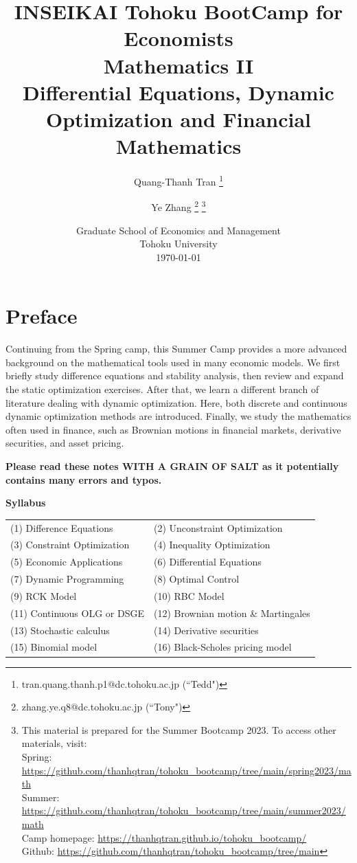 \documentclass[11pt,a4paper]{book}
\author{%
	Quang-Thanh Tran \thanks{tran.quang.thanh.p1@dc.tohoku.ac.jp (``Tedd")}
	\and Ye Zhang  \thanks{zhang.ye.q8@dc.tohoku.ac.jp (``Tony") } \footnote{ This material is prepared for the Summer Bootcamp 2023. To access other materials, visit: \\
		Spring: \url{https://github.com/thanhqtran/tohoku_bootcamp/tree/main/spring2023/math} \\
		Summer: \url{https://github.com/thanhqtran/tohoku_bootcamp/tree/main/summer2023/math} \\
		Camp homepage: \url{https://thanhqtran.github.io/tohoku_bootcamp/} \\ 
		Github: \url{https://github.com/thanhqtran/tohoku_bootcamp/tree/main}
	}
}
\title{INSEIKAI Tohoku BootCamp for Economists \\ \textbf{Mathematics II \\ \Large Differential Equations, Dynamic Optimization and Financial Mathematics}}
\date{Graduate School of Economics and Management \\Tohoku University \\[\baselineskip] \today \\[\baselineskip] 
	}
\theoremstyle{definition}\newtheorem{definition}{Definition}
\theoremstyle{definition}\newtheorem{fact}{Fact}
\theoremstyle{definition}\newtheorem{remark}{Remark}
\theoremstyle{definition}\newtheorem{ex}{Ex.}
\theoremstyle{definition}\newtheorem{project}{Project}
\theoremstyle{definition}\newtheorem{problem}{Problem}
\theoremstyle{definition}\newtheorem{example}{Example}
\numberwithin{theorem}{section}
\numberwithin{corollary}{chapter}
\numberwithin{assumption}{chapter}
\numberwithin{definition}{chapter}
\numberwithin{prop}{chapter}
\numberwithin{notation}{chapter}
\numberwithin{problem}{chapter}
\numberwithin{example}{chapter}
\numberwithin{fact}{chapter}
\numberwithin{ex}{chapter}
\renewcommand*{\thefootnote}{(\arabic{footnote})}
\begin{document}
	{
		\makeatletter
		\addtocounter{footnote}{1} %
		\renewcommand\thefootnote{\@fnsymbol\c@footnote}%
		\makeatother
		\maketitle
	}
	
	\setcounter{footnote}{0}
	\setcounter{tocdepth}{2}
	\tableofcontents
	
	\chapter*{Preface}
	
		Continuing from the Spring camp, this Summer Camp provides a more advanced background on the mathematical tools used in many economic models. We first briefly study difference equations and stability analysis, then review and expand the static optimization exercises. After that, we learn a different branch of literature dealing with dynamic optimization. Here, both discrete and continuous dynamic optimization methods are introduced. Finally, we study the mathematics often used in finance, such as Brownian motions in financial markets, derivative securities, and asset pricing.
		
		\textbf{Please read these notes WITH A GRAIN OF SALT as it potentially contains many errors and typos.}
	
	
	\textbf{Syllabus}	
	\begin{table}[ht]
		\centering
		\begin{tabular}{ l  l}
			\hline 
			(1) Difference Equations                     & (2) Unconstraint Optimization                 \\
			(3) Constraint Optimization    & (4) Inequality Optimization   \\
			(5) Economic Applications              & (6) Differential Equations    \\
			(7) Dynamic Programming & (8) Optimal Control             \\
			(9) RCK Model & (10) RBC Model          \\
			(11) Continuous OLG or DSGE  & (12) Brownian motion \& Martingales \\
			(13) Stochastic calculus   & (14) Derivative securities \\
			(15)  Binomial model  & (16) Black-Scholes pricing model\\
			\hline
		\end{tabular}
	\end{table}
	
\end{document}
